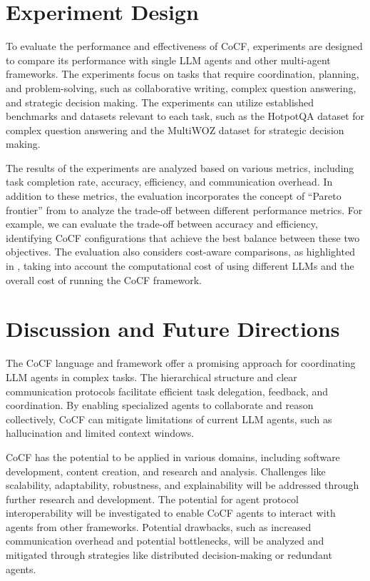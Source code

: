 \section{Experiment Design}
\label{sec:Experiment}

To evaluate the performance and effectiveness of CoCF, experiments are designed
to compare its performance with single LLM agents and other multi-agent
frameworks. The experiments focus on tasks that require coordination, planning, and
problem-solving, such as collaborative writing, complex question answering, and
strategic decision making. The experiments can utilize established benchmarks and
datasets relevant to each task, such as the HotpotQA dataset for complex
question answering and the MultiWOZ dataset for strategic decision making.

The results of the experiments are analyzed based on various metrics, including task
completion rate, accuracy, efficiency, and communication overhead. In addition to
these metrics, the evaluation incorporates the concept of ``Pareto frontier''
from \cite{kapoor2024aiagentsmatter} to analyze the trade-off between different
performance metrics. For example, we can evaluate the trade-off between accuracy
and efficiency, identifying CoCF configurations that achieve the best balance between
these two objectives. The evaluation also considers cost-aware comparisons, as highlighted
in \cite{kapoor2024aiagentsmatter}, taking into account the computational cost
of using different LLMs and the overall cost of running the CoCF framework.

\section{Discussion and Future Directions}
\label{sec:discussion}

The CoCF language and framework offer a promising approach for coordinating LLM agents
in complex tasks. The hierarchical structure and clear communication protocols
facilitate efficient task delegation, feedback, and coordination. By enabling specialized
agents to collaborate and reason collectively, CoCF can mitigate limitations of
current LLM agents, such as hallucination and limited context windows.

CoCF has the potential to be applied in various domains, including software
development, content creation, and research and analysis. Challenges like scalability,
adaptability, robustness, and explainability will be addressed through further
research and development. The potential for agent protocol interoperability will
be investigated to enable CoCF agents to interact with agents from other frameworks.
Potential drawbacks, such as increased communication overhead and potential bottlenecks,
will be analyzed and mitigated through strategies like distributed decision-making
or redundant agents.

